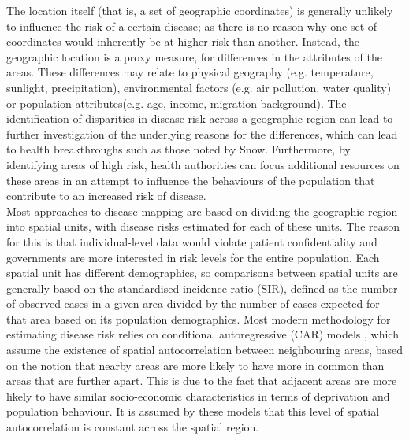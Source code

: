 The location itself (that is, a set of geographic coordinates) is generally unlikely to influence the risk of a certain disease; as there is no reason why one set of coordinates would inherently be at higher risk than another. Instead, the geographic location is a proxy measure, for differences in the attributes of the areas. These differences may relate to physical geography (e.g. temperature, sunlight, precipitation), environmental factors (e.g. air pollution, water quality) or population attributes(e.g. age, income, migration background). The identification of disparities in disease risk across a geographic region can lead to further investigation of the underlying reasons for the differences, which can lead to health breakthroughs such as those noted by Snow. Furthermore, by identifying areas of high risk, health authorities can focus additional resources on these areas in an attempt to influence the behaviours of the population that contribute to an increased risk of disease. \\
Most approaches to disease mapping are based on dividing the geographic region into spatial units, with disease risks estimated for each of these units. The reason for this is that individual-level data would violate patient confidentiality and governments are more interested in risk levels for the entire population. Each spatial unit has different demographics, so comparisons between spatial units are generally based on the standardised incidence ratio (SIR), defined as the number of observed cases in a given area divided by the number of cases expected for that area based on its population demographics.  Most modern methodology for estimating disease risk relies on conditional autoregressive (CAR) models \autocite[][]{besag1991bayesian}, which assume the existence of spatial autocorrelation between neighbouring areas, based on the notion that nearby areas are more likely to have more in common than areas that are further apart. This is due to the fact that adjacent areas are more likely to have similar socio-economic characteristics in terms of deprivation and population behaviour. It is assumed by these models that this level of spatial autocorrelation is constant across the spatial region.
\clearpage
